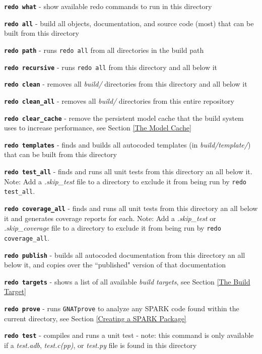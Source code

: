 \begin{spaceditemize}
  \item \textbf{\texttt{redo what}} - show available redo commands to run in this directory
  \item \textbf{\texttt{redo all}} - build all objects, documentation, and source code (most) that can be built from this directory
  \item \textbf{\texttt{redo path}} - runs \texttt{redo all} from all directories in the build path
  \item \textbf{\texttt{redo recursive}} - runs \texttt{redo all} from this directory and all below it
  \item \textbf{\texttt{redo clean}} - removes all \textit{build/} directories from this directory and all below it
  \item \textbf{\texttt{redo clean\_all}} - removes all \textit{build/} directories from this entire repository
  \item \textbf{\texttt{redo clear\_cache}} - remove the persistent model cache that the build system uses to increase performance, see Section \ref{The Model Cache}
  \item \textbf{\texttt{redo templates}} - finds and builds all autocoded templates (in \textit{build/template/}) that can be built from this directory
  \item \textbf{\texttt{redo test\_all}} - finds and runs all unit tests from this directory an all below it. Note: Add a \textit{.skip\_test} file to a directory to exclude it from being run by \texttt{redo test\_all}.
  \item \textbf{\texttt{redo coverage\_all}} - finds and runs all unit tests from this directory an all below it and generates coverage reports for each. Note: Add a \textit{.skip\_test} or \textit{.skip\_coverage} file to a directory to exclude it from being run by \texttt{redo coverage\_all}.
  \item \textbf{\texttt{redo publish}} - builds all autocoded documentation from this directory an all below it, and copies over the ``published" version of that documentation
  \item \textbf{\texttt{redo targets}} - shows a list of all available \textit{build targets}, see Section \ref{The Build Target}
  \item \textbf{\texttt{redo prove}} - runs \texttt{GNATprove} to analyze any SPARK code found within the current directory, see Section \ref{Creating a SPARK Package}
  \item \textbf{\texttt{redo test}} - compiles and runs a unit test - note: this command is only available if a \textit{test.adb}, \textit{test.c(pp)}, or \textit{test.py} file is found in this directory

\end{spaceditemize}
